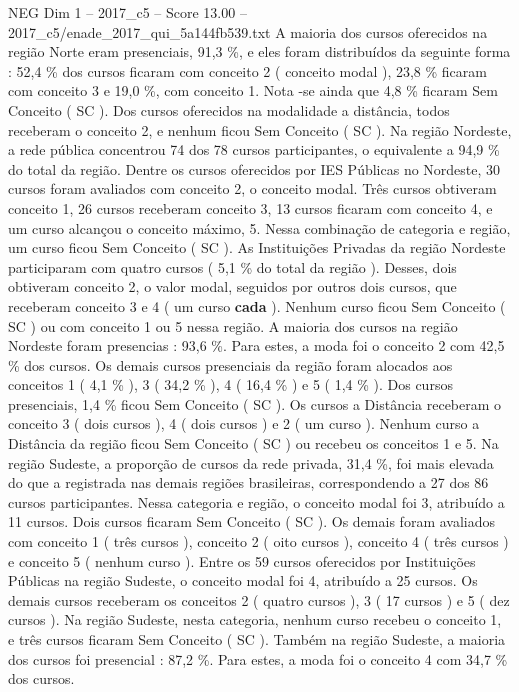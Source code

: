 \begin{textsample}{NEG Dim 1 – 2017\_c5 – Score 13.00 – 2017\_c5/enade\_2017\_qui\_5a144fb539.txt}
A maioria dos cursos oferecidos na região Norte eram presenciais, 91,3 \%, e eles foram distribuídos da seguinte forma : 52,4 \% dos cursos ficaram com conceito 2 ( conceito modal ), 23,8 \% ficaram com conceito 3 e 19,0 \%, com conceito 1.
Nota -se ainda que 4,8 \% ficaram Sem Conceito ( SC ).
Dos cursos oferecidos na modalidade a distância, todos receberam o conceito 2, e nenhum ficou Sem Conceito ( SC ).
Na região Nordeste, a rede pública concentrou 74 dos 78 cursos participantes, o equivalente a 94,9 \% do total da região.
Dentre os cursos oferecidos por IES Públicas no Nordeste, 30 cursos foram avaliados com conceito 2, o conceito modal.
Três cursos obtiveram conceito 1, 26 cursos receberam conceito 3, 13 cursos ficaram com conceito 4, e um curso alcançou o conceito máximo, 5.
Nessa combinação de categoria e região, um curso ficou Sem Conceito ( SC ).
As Instituições Privadas da região Nordeste participaram com quatro cursos ( 5,1 \% do total da região ).
Desses, dois obtiveram conceito 2, o valor modal, seguidos por outros dois cursos, que receberam conceito 3 e 4 ( um curso \textbf{cada} ).
Nenhum curso ficou Sem Conceito ( SC ) ou com conceito 1 ou 5 nessa região.
A maioria dos cursos na região Nordeste foram presencias : 93,6 \%.
Para estes, a moda foi o conceito 2 com 42,5 \% dos cursos.
Os demais cursos presenciais da região foram alocados aos conceitos 1 ( 4,1 \% ), 3 ( 34,2 \% ), 4 ( 16,4 \% ) e 5 ( 1,4 \% ).
Dos cursos presenciais, 1,4 \% ficou Sem Conceito ( SC ).
Os cursos a Distância receberam o conceito 3 ( dois cursos ), 4 ( dois cursos ) e 2 ( um curso ).
Nenhum curso a Distância da região ficou Sem Conceito ( SC ) ou recebeu os conceitos 1 e 5.
Na região Sudeste, a proporção de cursos da rede privada, 31,4 \%, foi mais elevada do que a registrada nas demais regiões brasileiras, correspondendo a 27 dos 86 cursos participantes.
Nessa categoria e região, o conceito modal foi 3, atribuído a 11 cursos.
Dois cursos ficaram Sem Conceito ( SC ).
Os demais foram avaliados com conceito 1 ( três cursos ), conceito 2 ( oito cursos ), conceito 4 ( três cursos ) e conceito 5 ( nenhum curso ).
Entre os 59 cursos oferecidos por Instituições Públicas na região Sudeste, o conceito modal foi 4, atribuído a 25 cursos.
Os demais cursos receberam os conceitos 2 ( quatro cursos ), 3 ( 17 cursos ) e 5 ( dez cursos ).
Na região Sudeste, nesta categoria, nenhum curso recebeu o conceito 1, e três cursos ficaram Sem Conceito ( SC ).
Também na região Sudeste, a maioria dos cursos foi presencial : 87,2 \%.
Para estes, a moda foi o conceito 4 com 34,7 \% dos cursos.

\end{textsample}
